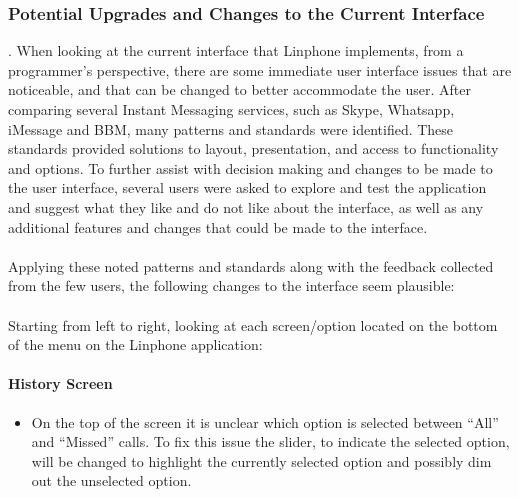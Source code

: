 \documentclass[11pt]{article}
\begin{document}
\subsubsection{Potential Upgrades and Changes to the Current Interface}.\newline
When looking at the current interface that Linphone implements, from a programmer's perspective, there are some immediate user interface issues that are noticeable, and that can be changed to better accommodate the user. After comparing several Instant Messaging services, such as Skype, Whatsapp, iMessage and BBM, many patterns and standards were identified. These standards provided solutions to layout, presentation, and access to functionality and options. To further assist with decision making and changes to be made to the user interface, several users were asked to explore and test the application and suggest what they like and do not like about the interface, as well as any additional features and changes that could be made to the interface.\\\\
Applying these noted patterns and standards along with the feedback collected from the few users, the following changes to the interface seem plausible: \\\\
Starting from left to right, looking at each screen/option located on the bottom of the menu on the Linphone application:
\paragraph{History Screen}
\begin{itemize}
\item On the top of the screen it is unclear which option is selected between \enquote{All} and \enquote{Missed} calls. To fix this issue the slider, to indicate the selected option, will be changed to highlight the currently selected option and possibly dim out the unselected option.
\end{itemize}
\end{document}
